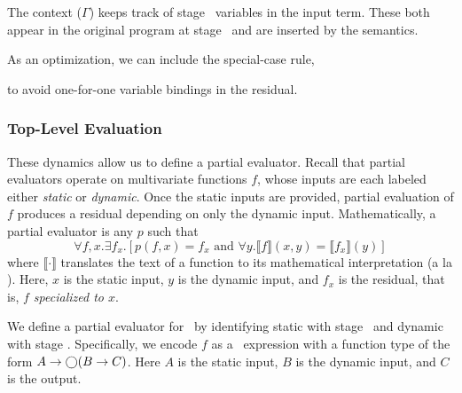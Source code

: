 The context ($\Gamma$) keeps track of stage \bbtwo\ variables in the input term. 
These both appear in the original program at stage \bbtwo\ and are inserted by the semantics.

As an optimization, we can include the special-case rule,
\begin{mathpar}
\end{mathpar}
to avoid one-for-one variable bindings in the residual.

\subsubsection {Top-Level Evaluation}
\label{sec:partialeval}


These dynamics allow us to define a partial evaluator.
Recall that partial evaluators operate on multivariate functions $f$, whose
inputs are each labeled either {\em static} or {\em dynamic}. Once the static
inputs are provided, partial evaluation of $f$ produces a residual depending on
only the dynamic input. Mathematically, a partial evaluator is any $p$ such
that
\[
	\forall f,x. \exists f_x. [p(f,x) = f_x \text{ and } \forall y.\llbracket f \rrbracket(x,y)=\llbracket f_x \rrbracket(y)]
\]
where $\llbracket \cdot \rrbracket$ translates the text of a function to its
mathematical interpretation (a la \cite{jones96}). Here, $x$ is the static
input, $y$ is the dynamic input, and $f_x$ is the residual, that is, \emph{$f$
specialized to $x$}.


We define a partial evaluator for \lang\ by identifying static with stage
\bbone\ and dynamic with stage \bbtwo.  Specifically, we encode $f$ as a \lang\
expression with a function type of the form $A\to\fut(B\to C)$.%
%
Here $A$ is the static input, $B$ is the dynamic input, and $C$ is the output.

